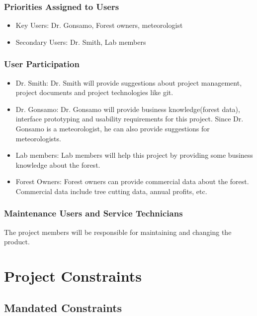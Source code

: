 \documentclass{article}
\begin{document}
\subsubsection{Priorities Assigned to Users}
\begin{itemize}
    \item Key Users: Dr. Gonsamo, Forest owners, meteorologist
    \item Secondary Users: Dr. Smith, Lab members
\end{itemize}
\subsubsection{User Participation}
\begin{itemize}
    \item Dr. Smith: Dr. Smith will provide suggestions about project management, project 
    documents and project technologies like git.
    \item Dr. Gonsamo: Dr. Gonsamo will provide business knowledge(forest data), 
    interface prototyping and usability requirements for this project. Since Dr. Gonsamo is 
    a meteorologist, he can also provide suggestions for meteorologists.
    \item Lab members: Lab members will help this project by providing some business knowledge
    about the forest.
    \item Forest Owners: Forest owners can provide commercial data about the forest. Commercial
    data include tree cutting data, annual profits, etc.
\end{itemize}
\subsubsection{Maintenance Users and Service Technicians}
The project members will be responsible for maintaining and changing the product.


\section{Project Constraints}
\subsection{Mandated Constraints}
\end{document}
